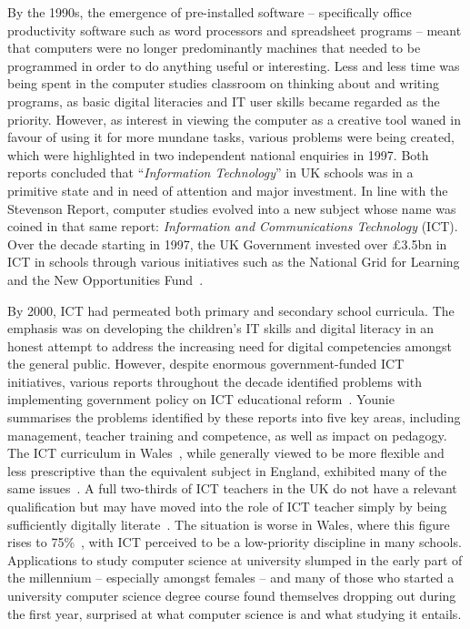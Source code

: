 By the 1990s, the emergence of pre-installed software -- specifically
office productivity software such as word processors and spreadsheet
programs -- meant that computers were no longer predominantly machines
that needed to be programmed in order to do anything useful or
interesting.  Less and less time was being spent in the computer
studies classroom on thinking about and writing programs, as basic
digital literacies and IT user skills became regarded as the
priority. However, as interest in viewing the computer as a creative
tool waned in favour of using it for more mundane tasks, various
problems were being created, which were highlighted in two independent
national enquiries in 1997.  Both reports concluded that
``{\emph{Information Technology}}'' in UK schools was in a primitive
state and in need of attention and major investment. In line with the
Stevenson Report, computer studies evolved into a new subject whose
name was coined in that same report: {\emph{Information and
Communications Technology}} (ICT).  Over the decade starting in 1997,
the UK Government invested over \pounds3.5bn in ICT in schools through
various initiatives such as the National Grid for Learning and the New
Opportunities Fund~\cite{Doughty:2006}.

By 2000, ICT had permeated both primary and secondary school
curricula. The emphasis was on developing the children's IT skills and
digital literacy in an honest attempt to address the increasing need
for digital competencies amongst the general public.  However, despite
enormous government-funded ICT initiatives, various reports throughout
the decade identified problems with implementing government policy on
ICT educational
reform~\cite{OpieFukuyo:2000,Ofsted:2001,Ofsted:2002,Ofsted:2004,Loveless:2005}.
Younie~\cite{Younie:2006} summarises the problems identified by these
reports into five key areas, including management, teacher training
and competence, as well as impact on pedagogy. The ICT curriculum in
Wales~\cite{welshictcurric:2008}, while generally viewed to be more
flexible and less prescriptive than the equivalent subject in England,
exhibited many of the same issues~\cite{estynict:2013,estynict:2014}.
A full two-thirds of ICT teachers in the UK do not have a relevant
qualification but may have moved into the role of ICT teacher simply
by being sufficiently digitally literate~\cite{RoyalSoc:2012}.  The
situation is worse in Wales, where this figure rises to
75\%~\cite{GTCW:2008}, with ICT perceived to be a low-priority
discipline in many schools. Applications to study computer science at
university slumped in the early part of the millennium -- especially
amongst females -- and many of those who started a university computer
science degree course found themselves dropping out during the first
year, surprised at what computer science is and what studying it
entails.

